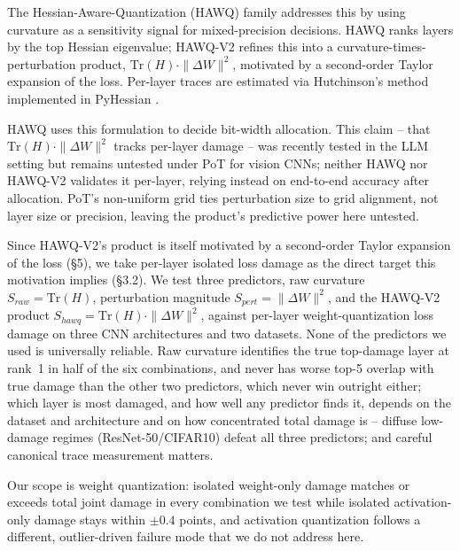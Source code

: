 \documentclass{article}
\begin{document}
The Hessian-Aware-Quantization (HAWQ) family addresses this by using curvature as a sensitivity signal for mixed-precision decisions. HAWQ \citep{dong_hawq_2019} ranks layers by the top Hessian eigenvalue; HAWQ-V2 \citep{dong_hawqv2_2020} refines this into a curvature-times-perturbation product, $\mathrm{Tr}(H)\cdot\|\Delta W\|^2$, motivated by a second-order Taylor expansion of the loss. Per-layer traces are estimated via Hutchinson's method implemented in PyHessian \citep{yao_pyhessian_2020}.

HAWQ uses this formulation to decide bit-width allocation. This claim -- that $\mathrm{Tr}(H)\cdot\|\Delta W\|^2$ tracks per-layer damage -- was recently tested in the LLM setting \citep{hill2026saturationmakesquantizationerror} but remains untested under PoT for vision CNNs; neither HAWQ \citep{dong_hawq_2019} nor HAWQ-V2 \citep{dong_hawqv2_2020} validates it per-layer, relying instead on end-to-end accuracy after allocation. PoT's non-uniform grid ties perturbation size to grid alignment, not layer size or precision, leaving the product's predictive power here untested.

Since HAWQ-V2's product is itself motivated by a second-order Taylor expansion of the loss (\S5), we take per-layer isolated loss damage as the direct target this motivation implies (\S3.2). We test three predictors, raw curvature $S_{raw}=\mathrm{Tr}(H)$, perturbation magnitude $S_{pert}=\|\Delta W\|^2$, and the HAWQ-V2 product $S_{hawq}=\mathrm{Tr}(H)\cdot\|\Delta W\|^2$, against per-layer weight-quantization loss damage on three CNN architectures and two datasets. None of the predictors we used is universally reliable. Raw curvature identifies the true top-damage layer at rank~1 in half of the six combinations, and never has worse top-5 overlap with true damage than the other two predictors, which never win outright either; which layer is most damaged, and how well any predictor finds it, depends on the dataset and architecture and on how concentrated total damage is -- diffuse low-damage regimes (ResNet-50/CIFAR10) defeat all three predictors; and careful canonical trace measurement matters.

Our scope is weight quantization: isolated weight-only damage matches or exceeds total joint damage in every combination we test while isolated activation-only damage stays within $\pm0.4$ points, and activation quantization follows a different, outlier-driven failure mode \citep{xiao_smoothquant_2023,lin_awq_2024} that we do not address here.
\end{document}
